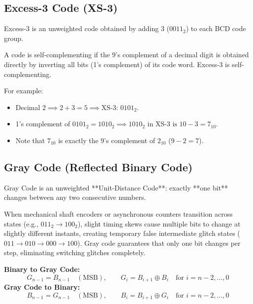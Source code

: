 \subsection{Excess-3 Code (XS-3)}
Excess-3 is an unweighted code obtained by adding $3$ ($0011_2$) to each BCD code group.

\begin{definition}
A code is self-complementing if the 9's complement of a decimal digit is obtained directly by inverting all bits (1's complement) of its code word. Excess-3 is self-complementing.
\end{definition}

\noindent For example:
\begin{itemize}
    \item Decimal $2 \implies 2 + 3 = 5 \implies \text{XS-3: } 0101_2$.
    \item 1's complement of $0101_2 = 1010_2 \implies 1010_2 \text{ in XS-3 is } 10 - 3 = 7_{10}$.
    \item Note that $7_{10}$ is exactly the 9's complement of $2_{10}$ ($9 - 2 = 7$).
\end{itemize}

\subsection{Gray Code (Reflected Binary Code)}
Gray Code is an unweighted **Unit-Distance Code**: exactly **one bit** changes between any two consecutive numbers.

\begin{examtip}
When mechanical shaft encoders or asynchronous counters transition across states (e.g., $011_2 \rightarrow 100_2$), slight timing skews cause multiple bits to change at slightly different instants, creating temporary false intermediate glitch states ($011 \rightarrow 010 \rightarrow 000 \rightarrow 100$). Gray code guarantees that only one bit changes per step, eliminating switching glitches completely.
\end{examtip}

\begin{keyequation}
\textbf{Binary to Gray Code:}
\begin{equation}
    G_{n-1} = B_{n-1} \quad (\text{MSB}), \qquad G_i = B_{i+1} \oplus B_i \quad \text{for } i = n-2, \dots, 0
\end{equation}
\textbf{Gray Code to Binary:}
\begin{equation}
    B_{n-1} = G_{n-1} \quad (\text{MSB}), \qquad B_i = B_{i+1} \oplus G_i \quad \text{for } i = n-2, \dots, 0
\end{equation}
\end{keyequation}


